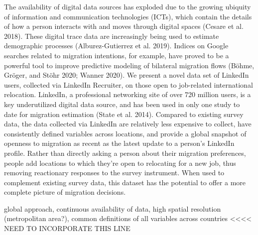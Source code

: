 The availability of digital data sources has exploded due to the growing ubiquity of information and communication technologies (ICTs), which contain the details of how a person interacts with and moves through digital spaces (Cesare et al. 2018). These digital trace data are increasingly being used to estimate demographic processes (Alburez-Gutierrez et al. 2019). Indices on Google searches related to migration intentions, for example, have proved to be a powerful tool to improve predictive modeling of bilateral migration flows (Böhme, Gröger, and Stöhr 2020; Wanner 2020). We present a novel data set of LinkedIn users, collected via LinkedIn Recruiter, on those open to job-related international relocation. LinkedIn, a professional networking site of over 720 million users, is a key underutilized digital data source, and has been used in only one study to date for migration estimation (State et al. 2014). Compared to existing survey data, the data collected via LinkedIn are relatively less expensive to collect, have consistently defined variables across locations, and provide a global snapshot of openness to migration as recent as the latest update to a person’s LinkedIn profile. Rather than directly asking a person about their migration preferences, people add locations to which they're open to relocating for a new job, thus removing reactionary responses to the survey instrument. When used to complement existing survey data, this dataset has the potential to offer a more complete picture of migration decisions.

global approach, continuous availability of data, high spatial resolution (metropolitan area?), common definitions of all variables across countries <<<< NEED TO INCORPORATE THIS LINE

